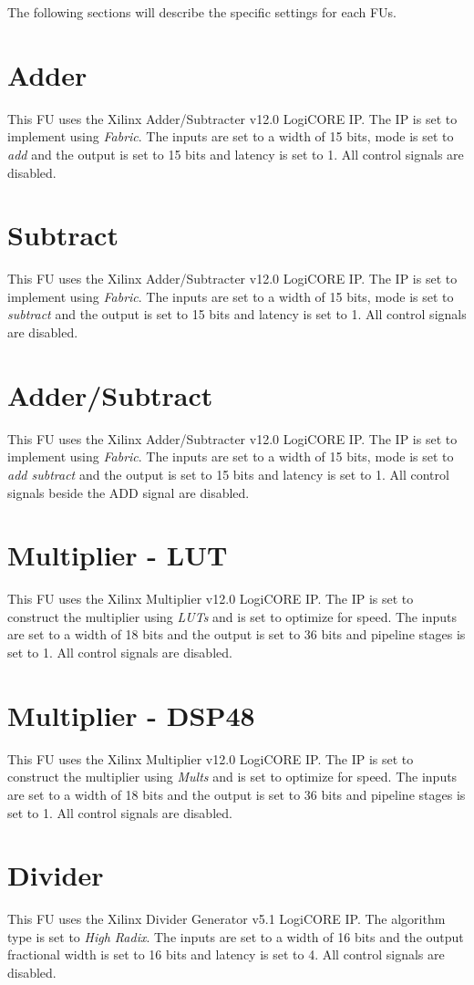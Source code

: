 The following sections will describe the specific settings for each FUs. 

\section{Adder}
This FU uses the Xilinx Adder/Subtracter v12.0 LogiCORE IP. The IP is set to implement using \textit{Fabric}. The inputs are set to a width of 15 bits, mode is set to \textit{add} and the output is set to 15 bits and latency is set to 1. All control signals are disabled.

\section{Subtract}
This FU uses the Xilinx Adder/Subtracter v12.0 LogiCORE IP. The IP is set to implement using \textit{Fabric}. The inputs are set to a width of 15 bits, mode is set to \textit{subtract} and the output is set to 15 bits and latency is set to 1. All control signals are disabled.

\section{Adder/Subtract}
This FU uses the Xilinx Adder/Subtracter v12.0 LogiCORE IP. The IP is set to implement using \textit{Fabric}. The inputs are set to a width of 15 bits, mode is set to \textit{add subtract} and the output is set to 15 bits and latency is set to 1. All control signals beside the ADD signal are disabled.

\section{Multiplier - LUT}
This FU uses the Xilinx Multiplier v12.0 LogiCORE IP. The IP is set to construct the multiplier using \textit{LUTs} and is set to optimize for speed. The inputs are set to a width of 18 bits and the output is set to 36 bits and pipeline stages is set to 1. All control signals are disabled.

\section{Multiplier - DSP48}
This FU uses the Xilinx Multiplier v12.0 LogiCORE IP. The IP is set to construct the multiplier using \textit{Mults} and is set to optimize for speed. The inputs are set to a width of 18 bits and the output is set to 36 bits and pipeline stages is set to 1. All control signals are disabled.

\section{Divider}
This FU uses the Xilinx Divider Generator v5.1 LogiCORE IP. The algorithm type is set to \textit{High Radix}. The inputs are set to a width of 16 bits and the output fractional width is set to 16 bits and latency is set to 4. All control signals are disabled.